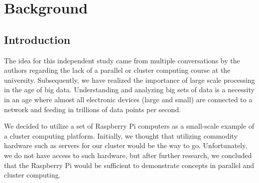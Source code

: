 
\chapter{Background} %

\label{Chapter1} %


\newcommand{\keyword}[1]{\textbf{#1}}
\newcommand{\tabhead}[1]{\textbf{#1}}
\newcommand{\code}[1]{\texttt{#1}}
\newcommand{\file}[1]{\texttt{\bfseries#1}}
\newcommand{\option}[1]{\texttt{\itshape#1}}


\section{Introduction}
	The idea for this independent study came from multiple conversations by the authors regarding the lack of a parallel or cluster computing course at the university. Subsequently, we have realized the importance of large scale processing in the age of big data. Understanding and analyzing big sets of data is a necessity in an age where almost all electronic devices (large and small) are connected to a network and feeding in trillions of data points per second. 
	
	We decided to utilize a set of Raspberry Pi computers as a small-scale example of a cluster computing platform. Initially, we thought that utilizing commodity hardware such as servers for our cluster would be the way to go. Unfortunately, we do not have access to such hardware, but after further research, we concluded that the Raspberry Pi would be sufficient to demonstrate concepts in parallel and cluster computing. 
	
